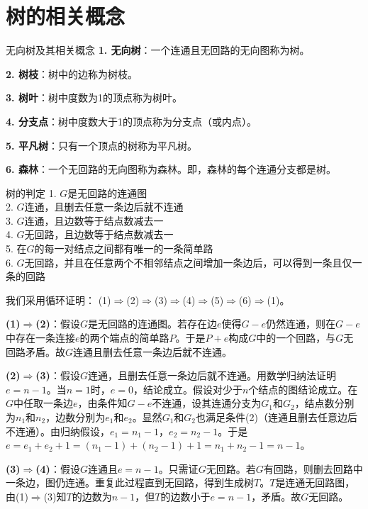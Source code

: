\documentclass[lang=cn,11pt]{elegantbook}
\begin{document}
\section{树的相关概念}
\begin{definition}{无向树及其相关概念}
    \textbf{1. 无向树}：一个连通且无回路的无向图称为树。

    \textbf{2. 树枝}：树中的边称为树枝。

    \textbf{3. 树叶}：树中度数为1的顶点称为树叶。

    \textbf{4. 分支点}：树中度数大于1的顶点称为分支点（或内点）。

    \textbf{5. 平凡树}：只有一个顶点的树称为平凡树。

    \textbf{6. 森林}：一个无回路的无向图称为森林。即，森林的每个连通分支都是树。
\end{definition}
\begin{theorem}{树的判定}
    1. $G$是无回路的连通图\\
    2. $G$连通，且删去任意一条边后就不连通\\
    3. $G$连通，且边数等于结点数减去一\\
    4. $G$无回路，且边数等于结点数减去一\\
    5. 在$G$的每一对结点之间都有唯一的一条简单路\\
    6. $G$无回路，并且在任意两个不相邻结点之间增加一条边后，可以得到一条且仅一条的回路
\end{theorem}
我们采用循环证明：
(1)$\Rightarrow$(2)$\Rightarrow$(3)$\Rightarrow$(4)$\Rightarrow$(5)$\Rightarrow$(6)$\Rightarrow$(1)。

\textbf{(1)$\Rightarrow$(2)}：假设$G$是无回路的连通图。若存在边$e$使得$G-e$仍然连通，则在$G-e$中存在一条连接$e$的两个端点的简单路$P$。于是$P+e$构成$G$中的一个回路，与$G$无回路矛盾。故$G$连通且删去任意一条边后就不连通。

\textbf{(2)$\Rightarrow$(3)}：假设$G$连通，且删去任意一条边后就不连通。用数学归纳法证明$e=n-1$。当$n=1$时，$e=0$，结论成立。假设对少于$n$个结点的图结论成立。在$G$中任取一条边$e$，由条件知$G-e$不连通，设其连通分支为$G_1$和$G_2$，结点数分别为$n_1$和$n_2$，边数分别为$e_1$和$e_2$。显然$G_1$和$G_2$也满足条件(2)（连通且删去任意边后不连通）。由归纳假设，$e_1=n_1-1$，$e_2=n_2-1$。于是$e=e_1+e_2+1=(n_1-1)+(n_2-1)+1=n_1+n_2-1=n-1$。

\textbf{(3)$\Rightarrow$(4)}：假设$G$连通且$e=n-1$。只需证$G$无回路。若$G$有回路，则删去回路中一条边，图仍连通。重复此过程直到无回路，得到生成树$T$。$T$是连通无回路图，由(1)$\Rightarrow$(3)知$T$的边数为$n-1$，但$T$的边数小于$e=n-1$，矛盾。故$G$无回路。
\end{document}
